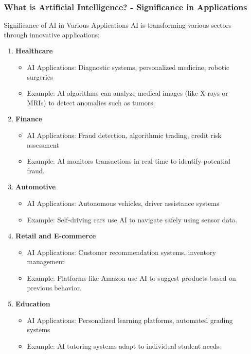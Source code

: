 \documentclass[aspectratio=169]{beamer}
\begin{document}
\begin{frame}[fragile]
    \frametitle{What is Artificial Intelligence? - Significance in Applications}
    \begin{block}{Significance of AI in Various Applications}
        AI is transforming various sectors through innovative applications:
    \end{block}
    \begin{enumerate}
        \item \textbf{Healthcare}
            \begin{itemize}
                \item AI Applications: Diagnostic systems, personalized medicine, robotic surgeries
                \item Example: AI algorithms can analyze medical images (like X-rays or MRIs) to detect anomalies such as tumors.
            \end{itemize}
        \item \textbf{Finance}
            \begin{itemize}
                \item AI Applications: Fraud detection, algorithmic trading, credit risk assessment
                \item Example: AI monitors transactions in real-time to identify potential fraud.
            \end{itemize}
        \item \textbf{Automotive}
            \begin{itemize}
                \item AI Applications: Autonomous vehicles, driver assistance systems
                \item Example: Self-driving cars use AI to navigate safely using sensor data.
            \end{itemize}
        \item \textbf{Retail and E-commerce}
            \begin{itemize}
                \item AI Applications: Customer recommendation systems, inventory management
                \item Example: Platforms like Amazon use AI to suggest products based on previous behavior.
            \end{itemize}
        \item \textbf{Education}
            \begin{itemize}
                \item AI Applications: Personalized learning platforms, automated grading systems
                \item Example: AI tutoring systems adapt to individual student needs.
            \end{itemize}
    \end{enumerate}
\end{frame}
\end{document}
